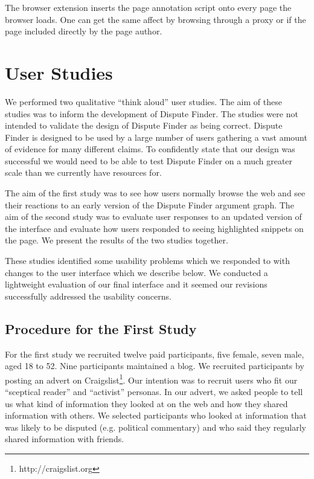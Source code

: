 \documentclass{www2010-submission}
\newcommand{\todo}[1]{}
\begin{document}
The browser extension inserts the page annotation script onto every page the browser loads. One can get the same affect by browsing through a proxy or if the page included directly by the page author.




\section{User Studies}

We performed two qualitative ``think aloud'' user studies. The aim of these studies was to inform the development of Dispute Finder. The studies were not intended to validate the design of Dispute Finder as being correct. Dispute Finder is designed to be used by a large number of users gathering a vast amount of evidence for many different claims. To confidently state that our design was successful we would need to be able to test Dispute Finder on a much greater scale than we currently have resources for.

The aim of the first study was to see how users normally browse the web and see their reactions to an early version of the Dispute Finder argument graph. The aim of the second study was to evaluate user responses to an updated version of the interface and evaluate how users responded to seeing highlighted snippets on the page. We present the results of the two studies together.

These studies identified some usability problems which we responded to with changes to the user interface which we describe below. We conducted a lightweight evaluation of our final interface and it seemed our revisions successfully addressed the usability concerns.

\todo{Test with at least 4 people}
\todo{Say something about final informal evaluation}


\subsection{Procedure for the First Study}

For the first study we recruited twelve paid participants, five female, seven male, aged 18 to 52. Nine participants maintained a blog. We recruited participants by posting an advert on Craigslist\footnote{http://craigslist.org}.
Our intention was to recruit users who fit our ``sceptical reader'' and ``activist'' personas. In our advert, we asked people to tell us what kind of information they looked at on the web and how they shared information with others. We selected participants who looked at information that was likely to be disputed (e.g. political commentary) and who said they regularly shared information with friends. 
\end{document}
